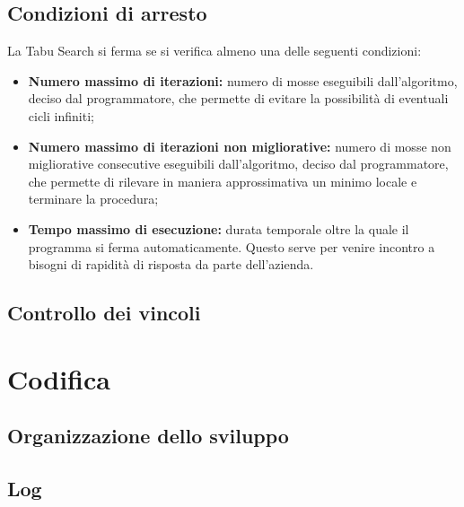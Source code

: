 \subsection{Condizioni di arresto}
\label{sec:condizioni-arresto}
\noindent La Tabu Search si ferma se si verifica almeno una delle seguenti condizioni:
\begin{itemize}
    \item \textbf{Numero massimo di iterazioni:} numero di mosse eseguibili dall'algoritmo, deciso
    dal programmatore, che permette di evitare la possibilità di eventuali cicli infiniti;
    \item \textbf{Numero massimo di iterazioni non migliorative:} numero di mosse non migliorative
    consecutive eseguibili dall'algoritmo, deciso dal programmatore, che permette
    di rilevare in maniera approssimativa un minimo
    locale e terminare la procedura;
    \item \textbf{Tempo massimo di esecuzione:}  durata temporale oltre
    la quale il programma si ferma automaticamente. Questo serve per venire incontro a
    bisogni di rapidità di risposta da parte dell’azienda.
    
\end{itemize}
\subsection{Controllo dei vincoli}
\label{sec:controllo-vincoli}

\section{Codifica}
\label{sec:codifica}

\subsection{Organizzazione dello sviluppo}
\label{sec:organizzazione-sviluppo}

\subsection{Log}
\label{sec:log}

